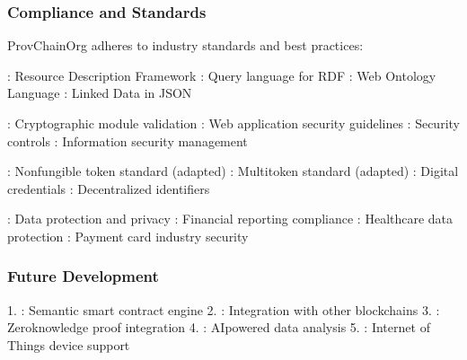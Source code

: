 \documentclass[letterpaper,10pt,english]{sphinxmanual}
\begin{document}
\subsubsection{Compliance and Standards}
\label{\detokenize{research/technical-specifications:compliance-and-standards}}
\sphinxAtStartPar
ProvChainOrg adheres to industry standards and best practices:

\sphinxAtStartPar
{}
\sphinxhyphen{} : Resource Description Framework
\sphinxhyphen{} : Query language for RDF
\sphinxhyphen{} : Web Ontology Language
\sphinxhyphen{} : Linked Data in JSON

\sphinxAtStartPar
{}
\sphinxhyphen{} : Cryptographic module validation
\sphinxhyphen{} : Web application security guidelines
\sphinxhyphen{} : Security controls
\sphinxhyphen{} : Information security management

\sphinxAtStartPar
{}
\sphinxhyphen{} : Non\sphinxhyphen{}fungible token standard (adapted)
\sphinxhyphen{} : Multi\sphinxhyphen{}token standard (adapted)
\sphinxhyphen{} : Digital credentials
\sphinxhyphen{} : Decentralized identifiers

\sphinxAtStartPar
{}
\sphinxhyphen{} : Data protection and privacy
\sphinxhyphen{} : Financial reporting compliance
\sphinxhyphen{} : Healthcare data protection
\sphinxhyphen{} : Payment card industry security


\subsubsection{Future Development}
\label{\detokenize{research/technical-specifications:future-development}}
\sphinxAtStartPar
{}
1. : Semantic smart contract engine
2. : Integration with other blockchains
3. : Zero\sphinxhyphen{}knowledge proof integration
4. : AI\sphinxhyphen{}powered data analysis
5. : Internet of Things device support
\end{document}
